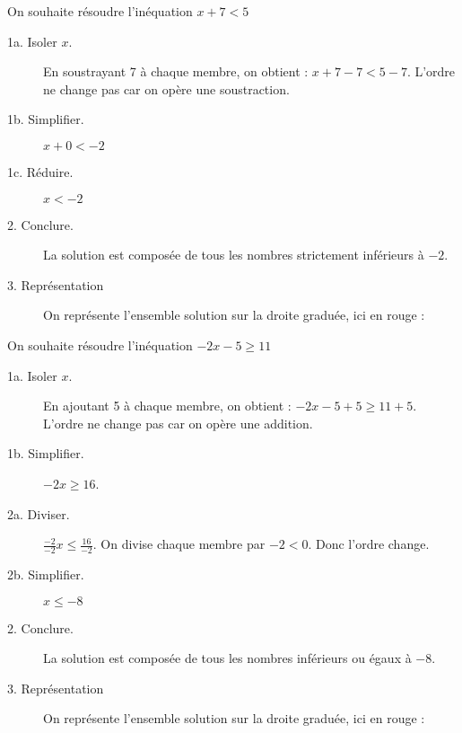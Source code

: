 \documentclass[openany]{book}
\begin{document}
\begin{Mt}   
On souhaite résoudre l'inéquation $x + 7 < 5$
\begin{description}
\item[1a. Isoler $x$.] En soustrayant 7 à chaque membre, on obtient : $x + 7 - 7 < 5 - 7$. L'ordre ne change pas car on opère une soustraction.
\item[1b. Simplifier.]  $x +0 < - 2$ 
\item[1c. Réduire.]  $x < - 2$  
\item[2. Conclure.] La solution est composée de tous les nombres strictement inférieurs  à $-2$.
\item[3. Représentation] On représente l'ensemble solution sur la droite graduée, ici en rouge :
 
\end{description}
\end{Mt} 

\begin{Mt}   
On souhaite résoudre l'inéquation $-2x - 5 \geq 11 $
\begin{description}
\item[1a. Isoler $x$.] En ajoutant 5 à chaque membre, on obtient :  $-2x - 5 +5 \geq 11 +5 $. L'ordre ne change pas car on opère une addition.
\item[1b. Simplifier.]  $-2x  \geq 16 $.
\item[2a. Diviser.]  $\frac{-2}{-2}x  \leq \frac{16}{-2}$. On divise chaque membre par $-2 <0$. Donc {\color{red}l'ordre change}.  
\item[2b. Simplifier.]  $x  \leq -8$  
\item[2. Conclure.] La solution est composée de tous les nombres inférieurs ou égaux à $-8$.
\item[3. Représentation]
On représente l'ensemble solution sur la droite graduée, ici en rouge : 

\end{description}
\end{Mt} 
\end{document}
